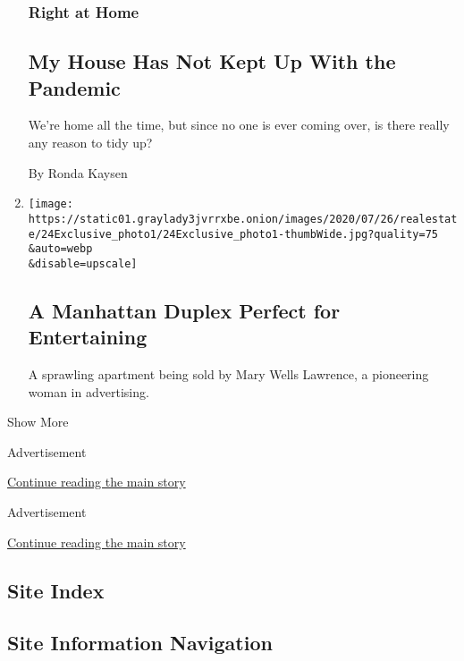 \begin{enumerate}
  \hypertarget{right-at-home}{%
  \subsubsection{Right at Home}\label{right-at-home}}

  \hypertarget{my-house-has-not-kept-up-with-the-pandemic}{%
  \subsection{My House Has Not Kept Up With the
  Pandemic}\label{my-house-has-not-kept-up-with-the-pandemic}}

  We're home all the time, but since no one is ever coming over, is
  there really any reason to tidy up?

  By Ronda Kaysen
\item
  \href{/slideshow/2020/07/24/realestate/a-manhattan-duplex-perfect-for-entertaining.html}{}

  \texttt{[image: https://static01.graylady3jvrrxbe.onion/images/2020/07/26/realestate/24Exclusive\_photo1/24Exclusive\_photo1-thumbWide.jpg?quality=75\\\&auto=webp\\\&disable=upscale]}

  \hypertarget{a-manhattan-duplex-perfect-for-entertaining}{%
  \subsection{A Manhattan Duplex Perfect for
  Entertaining}\label{a-manhattan-duplex-perfect-for-entertaining}}

  A sprawling apartment being sold by Mary Wells Lawrence, a pioneering
  woman in advertising.
\end{enumerate}

Show More

Advertisement

\protect\hyperlink{after-mid3}{Continue reading the main story}

Advertisement

\protect\hyperlink{after-mktg}{Continue reading the main story}

\hypertarget{site-index}{%
\subsection{Site Index}\label{site-index}}

\hypertarget{site-information-navigation}{%
\subsection{Site Information
Navigation}\label{site-information-navigation}}

